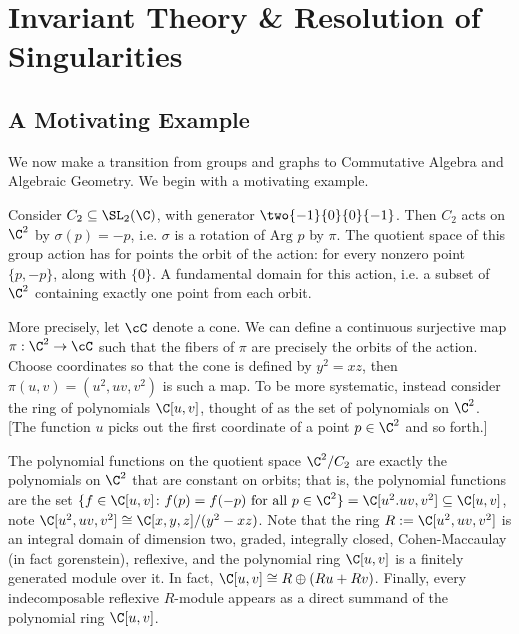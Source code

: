 \newpage
\section{Invariant Theory \& Resolution of Singularities}
\subsection{A Motivating Example}
We now make a transition from groups and graphs to Commutative Algebra and Algebraic Geometry. We begin with a motivating example. 


\begin{ex} \label{ex:mot}
Consider $C_2 \subseteq \SL_2(\C)$, with generator $\two{-1}{0}{0}{-1}$. Then $C_2$ acts on $\C^2$ by $\sigma(p)= -p$, i.e. $\sigma$ is a rotation of $\text{Arg }p$ by $\pi$. The quotient space of this group action has for points the orbit of the action: for every nonzero point $\{p,-p\}$, along with $\{0\}$. A fundamental domain for this action, i.e. a subset of $\C^2$ containing exactly one point from each orbit. 


More precisely, let $\cC$ denote a cone. We can define a continuous surjective map $\pi: \C^2 \to \cC$ such that the fibers of $\pi$ are precisely the orbits of the action. Choose coordinates so that the cone is defined by $y^2=xz$, then $\pi(u,v)= (u^2,uv,v^2)$ is such a map. To be more systematic, instead consider the ring of polynomials $\C[u,v]$, thought of as the set of polynomials on $\C^2$. [The function $u$ picks out the first coordinate of a point $p \in \C^2$ and so forth.] 

The polynomial functions on the quotient space $\C^2/C_2$ are exactly the polynomials on $\C^2$ that are constant on orbits; that is, the polynomial functions are the set $\{f \in \C[u,v] \colon f(p)=f(-p) \text{ for all } p \in \C^2\}=\C[u^2.uv,v^2] \subseteq \C[u,v]$, note $\C[u^2,uv,v^2] \cong \C[x,y,z]/(y^2-xz)$. Note that the ring $R:= \C[u^2,uv,v^2]$ is an integral domain of dimension two, graded, integrally closed, Cohen-Maccaulay (in fact gorenstein), reflexive, and the polynomial ring $\C[u,v]$ is a finitely generated module over it. In fact, $\C[u,v] \cong R \oplus (Ru + Rv)$. Finally, every indecomposable reflexive $R$-module appears as a direct summand of the polynomial ring $\C[u,v]$. \xqed
\end{ex}

